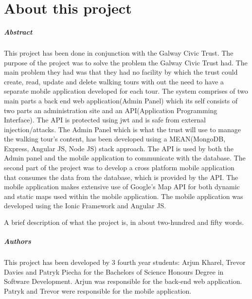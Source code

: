 
\chapter*{About this project}
\paragraph{Abstract}
This project has been done in conjunction with the Galway Civic Trust. The purpose of the project was to solve the problem the Galway Civic Trust had. The main problem they had was that they had no facility by which the trust could create, read, update and delete walking tours with out the need to have a separate mobile application developed for each tour. 
The system comprises of two main parts a back end web application(Admin Panel) which its self consists of two parts an administration site and an API(Application Programming Interface). The API is protected using jwt and is safe from external injection/attacks. The Admin Panel which is what the trust will use to manage the walking tour's content, has been developed using a MEAN(MongoDB, Express, Angular JS, Node JS) stack approach. The API is used by both the Admin panel and the mobile application to communicate with the database. The second part of the project was to develop a cross platform mobile application that consumes the data from the database, which is provided by the API. The mobile application makes extensive use of Google's Map API for both dynamic and static maps used within the mobile application. The mobile application was developed using the Ionic Framework and Angular JS. 


A brief description of what the project is, in about two-hundred and fifty words.

\paragraph{Authors}
This project has been developed by 3 fourth year students: Arjun Kharel, Trevor Davies and Patryk Piecha for the Bachelors of Science Honours Degree in Software Development.
Arjun was responsible for the back-end web application.
Patryk and Trevor were responsible for the mobile application.

